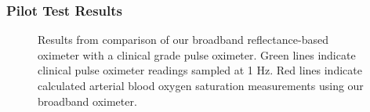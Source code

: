 \subsubsection{Pilot Test Results}
\begin{figure}
    \begin{center}
    \end{center}
    \caption{Results from comparison of our broadband reflectance-based oximeter with a clinical grade pulse oximeter. Green lines indicate clinical pulse oximeter readings sampled at 1 Hz. Red lines indicate calculated arterial blood oxygen saturation measurements using our broadband oximeter. } 
    \label{fig:D3results}
\end{figure} 
